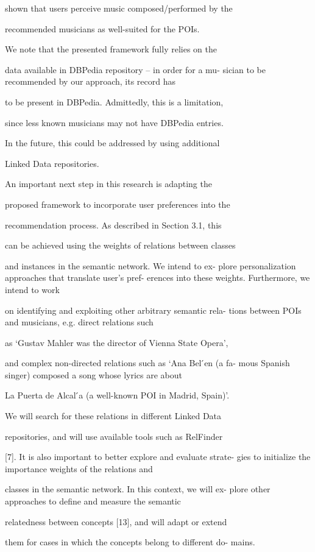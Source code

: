 shown that users perceive music composed/performed by the

recommended musicians as well-suited for the POIs.

We note that the presented framework fully relies on the

data available in DBPedia repository – in order for a mu-
sician to be recommended by our approach, its record has

to be present in DBPedia. Admittedly, this is a limitation,

since less known musicians may not have DBPedia entries.

In the future, this could be addressed by using additional

Linked Data repositories.

An important next step in this research is adapting the

proposed framework to incorporate user preferences into the

recommendation process. As described in Section 3.1, this

can be achieved using the weights of relations between classes

and instances in the semantic network. We intend to ex-
plore personalization approaches that translate user’s pref-
erences into these weights. Furthermore, we intend to work

on identifying and exploiting other arbitrary semantic rela-
tions between POIs and musicians, e.g. direct relations such

as ‘Gustav Mahler was the director of Vienna State Opera’,

and complex non-directed relations such as ‘Ana Bel ́en (a fa-
mous Spanish singer) composed a song whose lyrics are about

La Puerta de Alcal ́a (a well-known POI in Madrid, Spain)’.

We will search for these relations in different Linked Data

repositories, and will use available tools such as RelFinder

[7]. It is also important to better explore and evaluate strate-
gies to initialize the importance weights of the relations and

classes in the semantic network. In this context, we will ex-
plore other approaches to define and measure the semantic

relatedness between concepts [13], and will adapt or extend

them for cases in which the concepts belong to different do-
mains.



